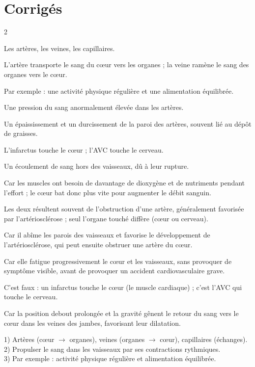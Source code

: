 \section{Corrigés}
\begin{multicols}{2}

Les artères, les veines, les capillaires.

L'artère transporte le sang du cœur vers les organes ; la veine ramène le sang des
organes vers le cœur.

Par exemple : une activité physique régulière et une alimentation équilibrée.

Une pression du sang anormalement élevée dans les artères.

Un épaississement et un durcissement de la paroi des artères, souvent lié au dépôt de
graisses.

L'infarctus touche le cœur ; l'AVC touche le cerveau.

Un écoulement de sang hors des vaisseaux, dû à leur rupture.

Car les muscles ont besoin de davantage de dioxygène et de nutriments pendant
l'effort ; le cœur bat donc plus vite pour augmenter le débit sanguin.

Les deux résultent souvent de l'obstruction d'une artère, généralement favorisée par
l'artériosclérose ; seul l'organe touché diffère (cœur ou cerveau).

Car il abîme les parois des vaisseaux et favorise le développement de
l'artériosclérose, qui peut ensuite obstruer une artère du cœur.

Car elle fatigue progressivement le cœur et les vaisseaux, sans provoquer de
symptôme visible, avant de provoquer un accident cardiovasculaire grave.

C'est faux : un infarctus touche le cœur (le muscle cardiaque) ; c'est l'AVC qui touche
le cerveau.

Car la position debout prolongée et la gravité gênent le retour du sang vers le
cœur dans les veines des jambes, favorisant leur dilatation.

1) Artères (cœur $\to$ organes), veines (organes $\to$ cœur), capillaires
(échanges).\\
2) Propulser le sang dans les vaisseaux par ses contractions rythmiques.\\
3) Par exemple : activité physique régulière et alimentation équilibrée.


\end{multicols}
